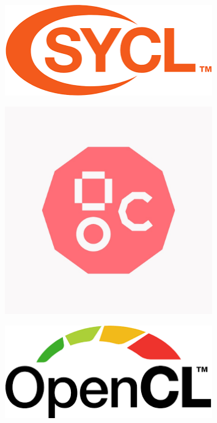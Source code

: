 \documentclass[aspectratio=1610,10pt]{penchbeamer}
\begin{document}
\begin{frame}
  \begin{minipage}{0.3\textwidth}
    \begin{figure}
      \begin{center}
        \includegraphics[width=0.8\textwidth]{static/sycl.png}
      \end{center}
    \end{figure}
  \end{minipage}
  \begin{minipage}{0.3\textwidth}
    \begin{figure}
      \begin{center}
        \includegraphics[width=0.8\textwidth]{static/graphcore.jpg}
      \end{center}
    \end{figure}
  \end{minipage}
  \begin{minipage}{0.3\textwidth}
    \begin{figure}
      \begin{center}
        \includegraphics[width=0.8\textwidth]{static/opencl.png}
      \end{center}
    \end{figure}
  \end{minipage}
\end{frame}
\end{document}
